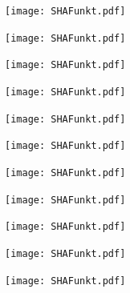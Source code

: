 \documentclass[
  10pt,
  ignorenonframetext,
  aspectratio=169,
]{beamer}
\begin{document}
\begin{frame}{}
\protect\hypertarget{section-10}{}
\texttt{[image: SHAFunkt.pdf]}
\end{frame}

\begin{frame}{}
\protect\hypertarget{section-11}{}
\texttt{[image: SHAFunkt.pdf]}
\end{frame}

\begin{frame}{}
\protect\hypertarget{section-12}{}
\texttt{[image: SHAFunkt.pdf]}
\end{frame}

\begin{frame}{}
\protect\hypertarget{section-13}{}
\texttt{[image: SHAFunkt.pdf]}
\end{frame}

\begin{frame}{}
\protect\hypertarget{section-14}{}
\texttt{[image: SHAFunkt.pdf]}
\end{frame}

\begin{frame}{}
\protect\hypertarget{section-15}{}
\texttt{[image: SHAFunkt.pdf]}
\end{frame}

\begin{frame}{}
\protect\hypertarget{section-16}{}
\texttt{[image: SHAFunkt.pdf]}
\end{frame}

\begin{frame}{}
\protect\hypertarget{section-17}{}
\texttt{[image: SHAFunkt.pdf]}
\end{frame}

\begin{frame}{}
\protect\hypertarget{section-18}{}
\texttt{[image: SHAFunkt.pdf]}
\end{frame}

\begin{frame}{}
\protect\hypertarget{section-19}{}
\texttt{[image: SHAFunkt.pdf]}
\end{frame}

\begin{frame}{}
\protect\hypertarget{section-20}{}
\texttt{[image: SHAFunkt.pdf]}
\end{frame}
\end{document}
